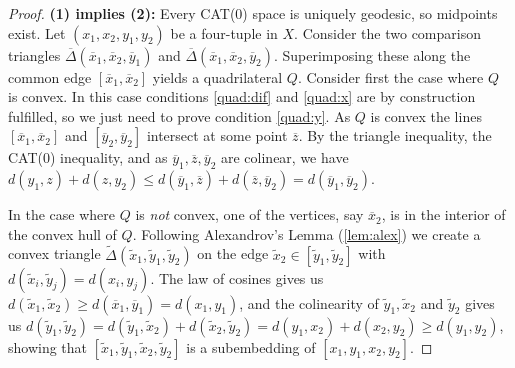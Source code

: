 \documentclass[11pt, a4paper, oneside]{memoir}
\theoremstyle{plain}\newtheorem{theorem}[subsection]{Theorem}
\theoremstyle{definition}
\begin{document}
\begin{proof}
\textbf{(1) implies (2):}
Every CAT(0) space is uniquely geodesic, so midpoints exist.
Let \((x_1,x_2,y_1,y_2)\) be a four-tuple in \(X\).
Consider the two comparison triangles \(\overline{\Delta}(\overline{x}_1,\overline{x}_2,\overline{y}_1)\) and \(\overline{\Delta}(\overline{x}_1,\overline{x}_2,\overline{y}_2)\).
Superimposing these along the common edge \([\overline{x}_1,\overline{x}_2]\) yields a quadrilateral \(Q\).
Consider first the case where \(Q\) is convex.
In this case conditions \eqref{quad:dif} and \eqref{quad:x} are by construction fulfilled, so we just need to prove condition \eqref{quad:y}.
As \(Q\) is convex the lines \([\overline{x}_1,\overline{x}_2]\) and \([\overline{y}_2,\overline{y}_2]\) intersect at some point \(\overline{z}\).
By the triangle inequality, the CAT(0) inequality, and as \(\overline{y}_1,\overline{z},\overline{y}_2\) are colinear, we have \(d(y_1,z)+d(z,y_2)\leq d(\overline{y}_1,\overline{z})+d(\overline{z},\overline{y}_2)=d(\overline{y}_1,\overline{y}_2)\).

In the case where \(Q\) is \emph{not} convex, one of the vertices, say \(\overline{x}_2\), is in the interior of the convex hull of \(Q\).
Following Alexandrov's Lemma (\ref{lem:alex}) we create a convex triangle \(\tilde{\Delta}(\tilde{x}_1,\tilde{y}_1,\tilde{y}_2)\) on the edge \(\tilde{x}_2\in [\tilde{y}_1,\tilde{y}_2]\) with \(d(\tilde{x}_i,\tilde{y}_j)=d(x_i,y_j)\).
The law of cosines gives us \(d(\tilde{x}_1,\tilde{x}_2)\geq d(\overline{x}_1,\overline{y}_1)=d(x_1,y_1)\), and the colinearity of \(\tilde{y}_1,\tilde{x}_2\) and \(\tilde{y}_2\) gives us \(d(\tilde{y}_1,\tilde{y}_2)=d(\tilde{y}_1,\tilde{x}_2)+d(\tilde{x}_2,\tilde{y}_2)=d(y_1,x_2)+d(x_2,y_2)\geq d(y_1,y_2)\), showing that \([\tilde{x}_1,\tilde{y}_1,\tilde{x}_2,\tilde{y}_2]\) is a subembedding of \([x_1,y_1,x_2,y_2]\). 
 

\end{proof}
\end{document}

